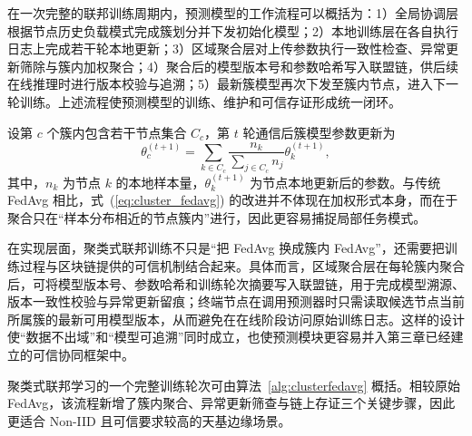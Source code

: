 \begin{table}[H]
\centering
\footnotesize
\caption{分层聚类联邦学习架构中的角色划分}
\label{tab:fl_roles}
\setlength{\tabcolsep}{2.0mm}
\renewcommand{\arraystretch}{1.15}
\end{table}

在一次完整的联邦训练周期内，预测模型的工作流程可以概括为：1）全局协调层根据节点历史负载模式完成簇划分并下发初始化模型；2）本地训练层在各自执行日志上完成若干轮本地更新；3）区域聚合层对上传参数执行一致性检查、异常更新筛除与簇内加权聚合；4）聚合后的模型版本号和参数哈希写入联盟链，供后续在线推理时进行版本校验与追溯；5）最新簇模型再次下发至簇内节点，进入下一轮训练。上述流程使预测模型的训练、维护和可信存证形成统一闭环。

设第 $c$ 个簇内包含若干节点集合 $C_c$，第 $t$ 轮通信后簇模型参数更新为
\begin{equation}
\theta_c^{(t+1)} =
\sum_{k \in C_c}
\frac{n_k}{\sum_{j \in C_c}n_j}
\theta_k^{(t+1)},
\label{eq:cluster_fedavg}
\end{equation}
其中，$n_k$ 为节点 $k$ 的本地样本量，$\theta_k^{(t+1)}$ 为节点本地更新后的参数。与传统 FedAvg 相比，式~(\ref{eq:cluster_fedavg}) 的改进并不体现在加权形式本身，而在于聚合只在“样本分布相近的节点簇内”进行，因此更容易捕捉局部任务模式。

在实现层面，聚类式联邦训练不只是“把 FedAvg 换成簇内 FedAvg”，还需要把训练过程与区块链提供的可信机制结合起来。具体而言，区域聚合层在每轮簇内聚合后，可将模型版本号、参数哈希和训练轮次摘要写入联盟链，用于完成模型溯源、版本一致性校验与异常更新留痕；终端节点在调用预测器时只需读取候选节点当前所属簇的最新可用模型版本，从而避免在在线阶段访问原始训练日志。这样的设计使“数据不出域”和“模型可追溯”同时成立，也使预测模块更容易并入第三章已经建立的可信协同框架中。

聚类式联邦学习的一个完整训练轮次可由算法~\ref{alg:clusterfedavg} 概括。相较原始 FedAvg，该流程新增了簇内聚合、异常更新筛查与链上存证三个关键步骤，因此更适合 Non-IID 且可信要求较高的天基边缘场景。

